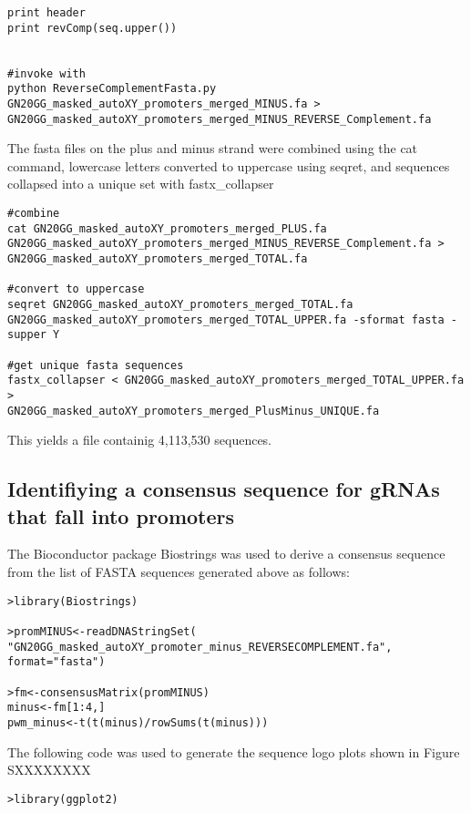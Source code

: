 \begin{footnotesize}
\begin{lstlisting}
print header
print revComp(seq.upper())


#invoke with
python ReverseComplementFasta.py GN20GG_masked_autoXY_promoters_merged_MINUS.fa >
GN20GG_masked_autoXY_promoters_merged_MINUS_REVERSE_Complement.fa
\end{lstlisting}

The fasta files on the plus and minus strand were combined using the cat command, lowercase letters converted to uppercase using seqret, and sequences collapsed into a unique set with fastx\_collapser

\begin{lstlisting}
#combine
cat GN20GG_masked_autoXY_promoters_merged_PLUS.fa 
GN20GG_masked_autoXY_promoters_merged_MINUS_REVERSE_Complement.fa >
GN20GG_masked_autoXY_promoters_merged_TOTAL.fa

#convert to uppercase 
seqret GN20GG_masked_autoXY_promoters_merged_TOTAL.fa 
GN20GG_masked_autoXY_promoters_merged_TOTAL_UPPER.fa -sformat fasta -supper Y   

#get unique fasta sequences
fastx_collapser < GN20GG_masked_autoXY_promoters_merged_TOTAL_UPPER.fa >
GN20GG_masked_autoXY_promoters_merged_PlusMinus_UNIQUE.fa

\end{lstlisting}

This yields a file containig 4,113,530 sequences.

\subsection{Identifiying a consensus sequence for gRNAs that fall into promoters}

The Bioconductor package Biostrings\cite{Biostrings} was used to derive a consensus sequence from the list of FASTA sequences generated above as follows:

\begin{lstlisting}
>library(Biostrings)

>promMINUS<-readDNAStringSet(
"GN20GG_masked_autoXY_promoter_minus_REVERSECOMPLEMENT.fa", format="fasta")  

>fm<-consensusMatrix(promMINUS) 
minus<-fm[1:4,] 
pwm_minus<-t(t(minus)/rowSums(t(minus)))  

\end{lstlisting}

The following code  was used to generate the sequence logo plots \cite{Berry:2006hv} shown in Figure SXXXXXXXX

\begin{lstlisting}
>library(ggplot2) 


\end{lstlisting}
\end{footnotesize}
